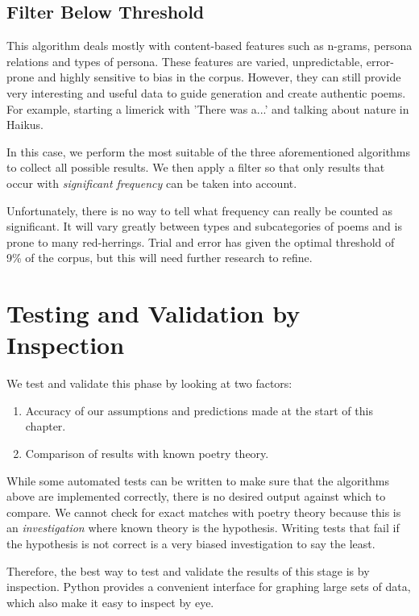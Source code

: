 \subsection{Filter Below Threshold}

This algorithm deals mostly with content-based features such as n-grams, persona relations and types of persona. These features are varied, unpredictable, error-prone and highly sensitive to bias in the corpus. However, they can still provide very interesting and useful data to guide generation and create authentic poems. For example, starting a limerick with 'There was a...' and talking about nature in Haikus.

In this case, we perform the most suitable of the three aforementioned algorithms to collect all possible results. We then apply a filter so that only results that occur with \textit{significant frequency} can be taken into account.

Unfortunately, there is no way to tell what frequency can really be counted as significant. It will vary greatly between types and subcategories of poems and is prone to many red-herrings. Trial and error has given the optimal threshold of 9\% of the corpus, but this will need further research to refine.

\section{Testing and Validation by Inspection}

We test and validate this phase by looking at two factors:
\begin{enumerate}
\item{Accuracy of our assumptions and predictions made at the start of this chapter.}
\item{Comparison of results with known poetry theory.}
\end{enumerate}

While some automated tests can be written to make sure that the algorithms above are implemented correctly, there is no desired output against which to compare. We cannot check for exact matches with poetry theory because this is an \textit{investigation} where known theory is the hypothesis. Writing tests that fail if the hypothesis is not correct is a very biased investigation to say the least.

Therefore, the best way to test and validate the results of this stage is by inspection. Python provides a convenient interface for graphing large sets of data, which also make it easy to inspect by eye. 

